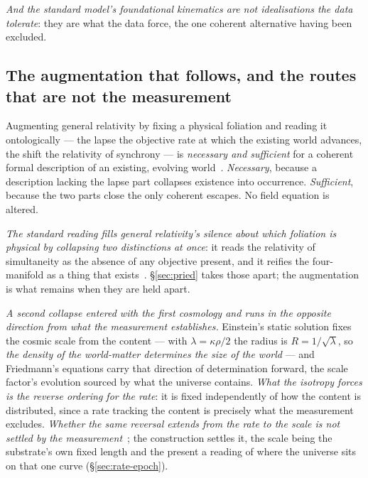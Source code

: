 \documentclass[11pt,a4paper]{article}
\theoremstyle{plain}
\theoremstyle{definition}
\begin{document}
\emph{And the standard model's foundational kinematics are not idealisations the data tolerate}: they are
what the data force, the one coherent alternative having been excluded.

\subsection{The augmentation that follows, and the routes that are not the measurement}

Augmenting general relativity by fixing a physical foliation and reading it ontologically --- the lapse the
objective rate at which the existing world advances, the shift the relativity of synchrony --- is
\emph{necessary and sufficient} for a coherent formal description of an existing, evolving
world~\cite{JanzenCRframework}. \emph{Necessary}, because a description lacking the lapse part collapses
existence into occurrence. \emph{Sufficient}, because the two parts close the only coherent escapes. No field
equation is altered.

\emph{The standard reading fills general relativity's silence about which foliation is physical by collapsing
two distinctions at once}: it reads the relativity of simultaneity as the absence of any objective present,
and it reifies the four-manifold as a thing that exists~\cite{JanzenModernParallax}. \S\ref{sec:pried} takes
those apart; the augmentation is what remains when they are held apart.

\emph{A second collapse entered with the first cosmology and runs in the opposite direction from what the
measurement establishes.} Einstein's static solution fixes the cosmic scale from the content --- with
$\lambda=\kappa\rho/2$ the radius is $R=1/\sqrt\lambda$, so \emph{the density of the world-matter determines
the size of the world} --- and Friedmann's equations carry that direction of determination forward, the scale
factor's evolution sourced by what the universe contains. \emph{What the isotropy forces is the reverse
ordering for the rate}: it is fixed independently of how the content is distributed, since a rate tracking
the content is precisely what the measurement excludes. \emph{Whether the same reversal extends from the rate
to the scale is not settled by the measurement}~\cite{JanzenModernParallax}; the construction settles it, the scale
being the substrate's own fixed length and the present a reading of where the universe sits on that one curve
(\S\ref{sec:rate-epoch}).
\end{document}
